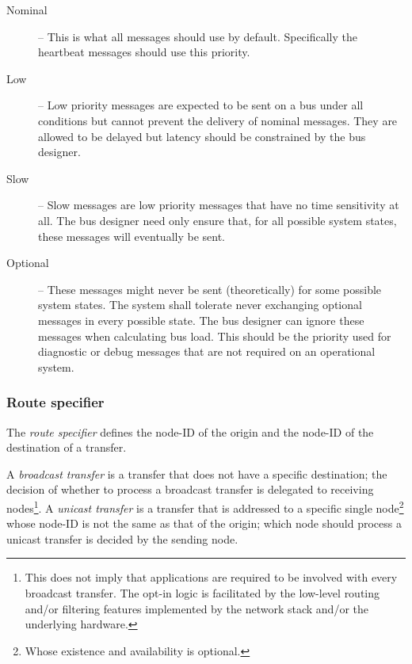 \begin{remark}[breakable]
\begin{description}
        \item[Nominal] -- This is what all messages should use by default.
        Specifically the heartbeat messages should use this priority.

        \item[Low] -- Low priority messages are expected to be sent on a bus under all conditions but cannot
        prevent the delivery of nominal messages.
        They are allowed to be delayed but latency should be constrained by the bus designer.

        \item[Slow] -- Slow messages are low priority messages that have no time sensitivity at all.
        The bus designer need only ensure that, for all possible system states,
        these messages will eventually be sent.

        \item[Optional] -- These messages might never be sent (theoretically) for some possible system states.
        The system shall tolerate never exchanging optional messages in every possible state.
        The bus designer can ignore these messages when calculating bus load.
        This should be the priority used for diagnostic or debug messages that are not required on an
        operational system.
    \end{description}
\end{remark}

\subsubsection{Route specifier}\label{sec:transport_route_specifier}

The \emph{route specifier} defines the node-ID of the origin and the node-ID of the destination of a transfer.

A \emph{broadcast transfer} is a transfer that does not have a specific destination;
the decision of whether to process a broadcast transfer is delegated to receiving nodes\footnote{%
    This does not imply that applications are required to be involved with every broadcast transfer.
    The opt-in logic is facilitated by the low-level routing and/or filtering features implemented
    by the network stack and/or the underlying hardware.
}.
A \emph{unicast transfer} is a transfer that is addressed to a specific single node\footnote{%
    Whose existence and availability is optional.
} whose node-ID is not the same as that of the origin;
which node should process a unicast transfer is decided by the sending node.

